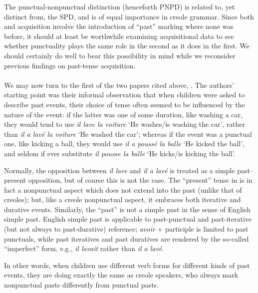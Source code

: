 The punctual-nonpunctual distinction (henceforth PNPD) is related to, yet distinct from, the SPD, and is of equal importance in creole grammar. Since both  and acquisition involve the introduction of ``past'' marking where none was before, it should at least be worthwhile examining acquisitional data to see whether punctuality plays the same role in the second as it does in the first. We should certainly do well to bear this possibility in mind while we reconsider previous findings on past-tense acquisition.\\\\

We may now turn to the first of the two papers cited above, \citet{BrockartEtAl1973}. The authors' starting point was their informal observation that when children were asked to describe past events, their choice of tense often seemed to be influenced by the nature of the event: if the latter was one of some duration, like washing a car, they would tend to use \textit{il lave la voiture} `He washes/is washing the car', rather than \textit{il a lav\'e la voiture} `He washed the car'; whereas if the event was a punctual one, like kicking a ball, they would use \textit{il a pouss\'e la balle} `He kicked the ball', and seldom if ever substitute \textit{il pousse la balle} `He kicks/is kicking the ball'.

Normally, the opposition between \textit{il lave} and \textit{il a lav\'e} is treated as a simple past--present opposition, but of course this is not the case. The ``present'' tense in  is in fact a nonpunctual aspect which does not extend into the past (unlike that of creoles); but, like a creole nonpunctual aspect, it embraces both iterative and durative events.
Similarly, the ``past'' is not a simple past in the sense of English simple past. English simple past is applicable to past-punctual and past-iterative (but not always to past-durative) reference;  \textit{avoir} + participle is limited to past punctuals, while past iteratives and past duratives are rendered by the so-called ``imperfect'' form, e.g., \textit{il lavait} rather than \textit{il a lav\'e}.

In other words, when  children use different verb forms for different kinds of past events, they are doing exactly the same as creole speakers, who always mark nonpunctual pasts differently from punctual pasts.

